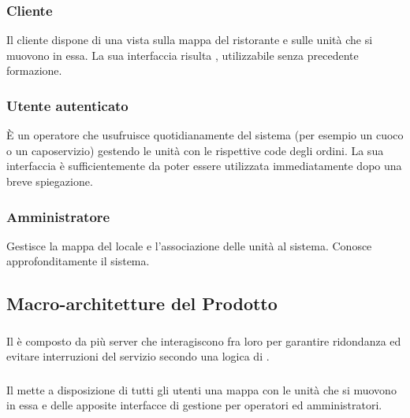     \subsubsection{Cliente}
    Il cliente dispone di una vista sulla mappa del ristorante e sulle unità che si muovono in essa. La sua interfaccia risulta , utilizzabile senza precedente formazione.

    \subsubsection{Utente autenticato}
    È un operatore che usufruisce quotidianamente del sistema (per esempio un cuoco o un caposervizio) gestendo le unità con le rispettive code degli ordini. La sua interfaccia è sufficientemente  da poter essere utilizzata immediatamente dopo una breve spiegazione.

    \subsubsection{Amministratore}
    Gestisce la mappa del locale e l'associazione delle unità al sistema. Conosce approfonditamente il sistema.

\subsection{Macro-architetture del Prodotto}
    \subsubsection{}
    Il  è composto da più server che interagiscono fra loro per garantire ridondanza ed evitare interruzioni del servizio secondo una logica di .

    \subsubsection{}
    Il  mette a disposizione di tutti gli utenti una mappa con le unità che si muovono in essa e delle apposite interfacce di gestione per operatori ed amministratori.
